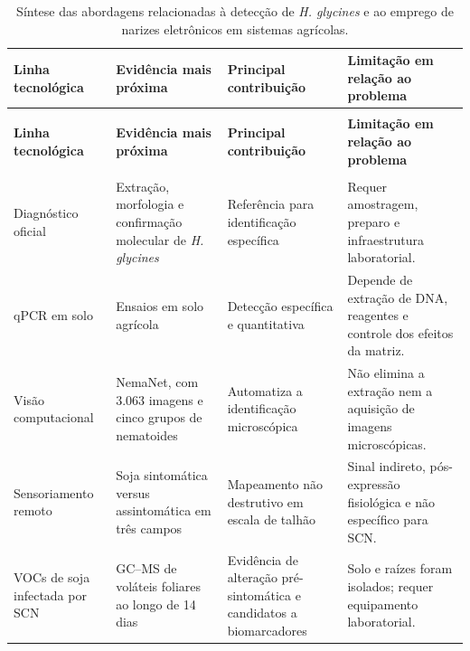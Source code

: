 \documentclass[12pt,a4paper]{article}
\begin{document}
\small
\begin{longtable}{>{\RaggedRight\arraybackslash}p{} >{\RaggedRight\arraybackslash}p{} >{\RaggedRight\arraybackslash}p{} >{\RaggedRight\arraybackslash}p{}}
\caption{Síntese das abordagens relacionadas à detecção de \textit{H. glycines} e ao emprego de narizes eletrônicos em sistemas agrícolas.}
\label{tab:estado-arte}\\
\toprule
\textbf{Linha tecnológica} & \textbf{Evidência mais próxima} & \textbf{Principal contribuição} & \textbf{Limitação em relação ao problema} \\
\midrule
\endfirsthead

\multicolumn{4}{c}{\tablename\ \thetable{} -- continuação}\\
\toprule
\textbf{Linha tecnológica} & \textbf{Evidência mais próxima} & \textbf{Principal contribuição} & \textbf{Limitação em relação ao problema} \\
\midrule
\endhead

\midrule
\multicolumn{4}{r}{Continua na próxima página}\\
\endfoot

\bottomrule
\endlastfoot

Diagnóstico oficial & Extração, morfologia e confirmação molecular de \textit{H. glycines} \cite{eppo2018} & Referência para identificação específica & Requer amostragem, preparo e infraestrutura laboratorial. \\

qPCR em solo & Ensaios em solo agrícola \cite{li2014qpcr,baidoo2021} & Detecção específica e quantitativa & Depende de extração de DNA, reagentes e controle dos efeitos da matriz. \\

Visão computacional & NemaNet, com 3.063 imagens e cinco grupos de nematoides \cite{abade2022} & Automatiza a identificação microscópica & Não elimina a extração nem a aquisição de imagens microscópicas. \\

Sensoriamento remoto & Soja sintomática versus assintomática em três campos \cite{santos2022} & Mapeamento não destrutivo em escala de talhão & Sinal indireto, pós-expressão fisiológica e não específico para SCN. \\

VOCs de soja infectada por SCN & GC--MS de voláteis foliares ao longo de 14 dias \cite{constantino2021} & Evidência de alteração pré-sintomática e candidatos a biomarcadores & Solo e raízes foram isolados; requer equipamento laboratorial. \\


\end{longtable}
\end{document}
